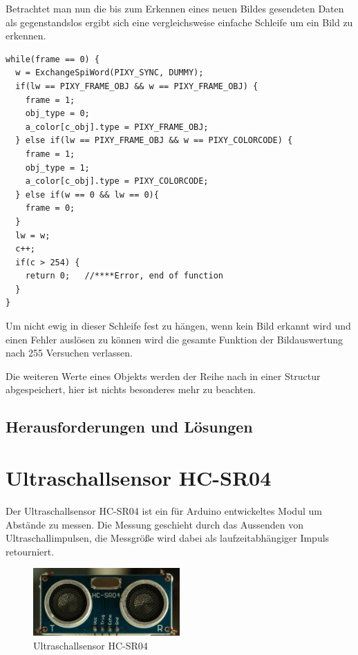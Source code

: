     Betrachtet man nun die bis zum Erkennen eines neuen Bildes gesendeten Daten als gegenstandslos ergibt sich eine vergleichsweise einfache Schleife um ein Bild zu erkennen.

    \lstset{language = c}
    \begin{lstlisting}
while(frame == 0) {
  w = ExchangeSpiWord(PIXY_SYNC, DUMMY);
  if(lw == PIXY_FRAME_OBJ && w == PIXY_FRAME_OBJ) {
    frame = 1;
    obj_type = 0;
    a_color[c_obj].type = PIXY_FRAME_OBJ;
  } else if(lw == PIXY_FRAME_OBJ && w == PIXY_COLORCODE) {
    frame = 1;
    obj_type = 1;
    a_color[c_obj].type = PIXY_COLORCODE;
  } else if(w == 0 && lw == 0){
    frame = 0;
  }
  lw = w;
  c++;
  if(c > 254) {
    return 0;	//****Error, end of function
  }
}
    \end{lstlisting}
    Um nicht ewig in dieser Schleife fest zu hängen, wenn kein Bild erkannt wird und einen Fehler auslösen zu können wird die gesamte Funktion der Bildauswertung
    nach 255 Versuchen verlassen.

    Die weiteren Werte eines Objekts werden der Reihe nach in einer Structur abgespeichert, hier ist nichts besonderes mehr zu beachten.

  \subsection{Herausforderungen und Lösungen}

\section{Ultraschallsensor HC-SR04}
Der Ultraschallsensor HC-SR04 ist ein für Arduino entwickeltes Modul um Abstände zu messen. Die Messung geschieht durch das Aussenden von Ultraschallimpulsen,
die Messgröße wird dabei als laufzeitabhängiger Impuls retourniert.

\begin{figure}[tbh]
  \begin{centering}
    \includegraphics[width = 0.5\textwidth]{Bilder/Ultraschallsensor}
  \par\end{centering}
  \caption{Ultraschallsensor HC-SR04}
  \label{Ultraschallsensor}
\end{figure}

